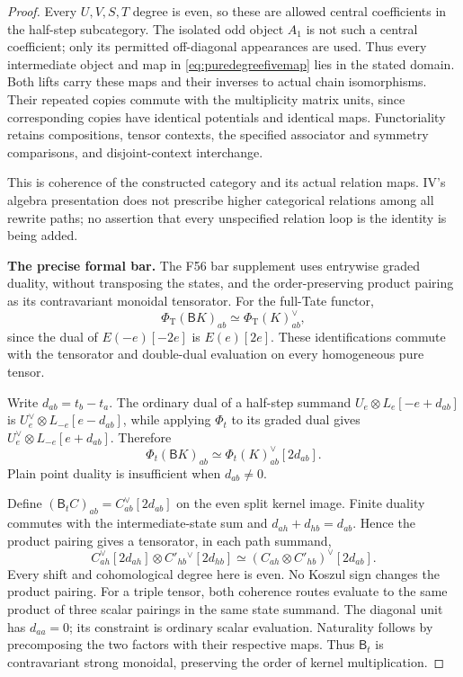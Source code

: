 \begin{proof}
Every \(U,V,S,T\) degree is even, so these are allowed
central coefficients in the half-step subcategory.
The isolated odd object \(A_1\) is not such a central
coefficient; only its permitted off-diagonal appearances
are used. Thus every intermediate object and map in
\eqref{eq:puredegreefivemap} lies in the stated domain.
Both lifts carry these maps and their inverses to actual
chain isomorphisms. Their repeated copies commute with
the multiplicity matrix units, since corresponding
copies have identical potentials and identical maps.
Functoriality retains compositions, tensor contexts,
the specified associator and symmetry comparisons,
and disjoint-context interchange.

This is coherence of the constructed category and its
actual relation maps. IV's algebra presentation does
not prescribe higher categorical relations among all
rewrite paths; no assertion that every unspecified
relation loop is the identity is being added.

\par\smallskip\noindent\textbf{The precise formal bar.}\quad
The F56 bar supplement uses entrywise graded duality,
without transposing the states, and the order-preserving
product pairing as its contravariant monoidal tensorator.
For the full-Tate functor,
\[
 \Phi_{\mathrm T}(\mathsf B K)_{ab}
     \simeq\Phi_{\mathrm T}(K)_{ab}^{\vee},
\]
since the dual of \(E(-e)[-2e]\) is \(E(e)[2e]\).
These identifications commute with the tensorator and
double-dual evaluation on every homogeneous pure tensor.

Write \(d_{ab}=t_b-t_a\). The ordinary dual of a half-step
summand \(U_e\otimes L_e[-e+d_{ab}]\) is
\(U_e^\vee\otimes L_{-e}[e-d_{ab}]\), while applying
\(\Phi_t\) to its graded dual gives
\(U_e^\vee\otimes L_{-e}[e+d_{ab}]\). Therefore
\begin{equation}\label{eq:purekernelbarcorrection}
 \Phi_t(\mathsf B K)_{ab}
      \simeq\Phi_t(K)_{ab}^{\vee}[2d_{ab}].
\end{equation}
Plain point duality is insufficient when \(d_{ab}\ne0\).

Define \((\mathsf B_t C)_{ab}=C_{ab}^\vee[2d_{ab}]\)
on the even split kernel image. Finite duality commutes
with the intermediate-state sum and
\(d_{ah}+d_{hb}=d_{ab}\). Hence the product pairing gives
a tensorator, in each path summand,
\[
 C_{ah}^\vee[2d_{ah}]
       \otimes C'_{hb}{}^\vee[2d_{hb}]
   \simeq (C_{ah}\otimes C'_{hb})^\vee[2d_{ab}].
\]
Every shift and cohomological degree here is even.
No Koszul sign changes the product pairing.
For a triple tensor, both coherence routes evaluate
to the same product of three scalar pairings in the
same state summand. The diagonal unit has \(d_{aa}=0\);
its constraint is ordinary scalar evaluation.
Naturality follows by precomposing the two factors
with their respective maps. Thus \(\mathsf B_t\)
is contravariant strong monoidal, preserving the
order of kernel multiplication.


\end{proof}
